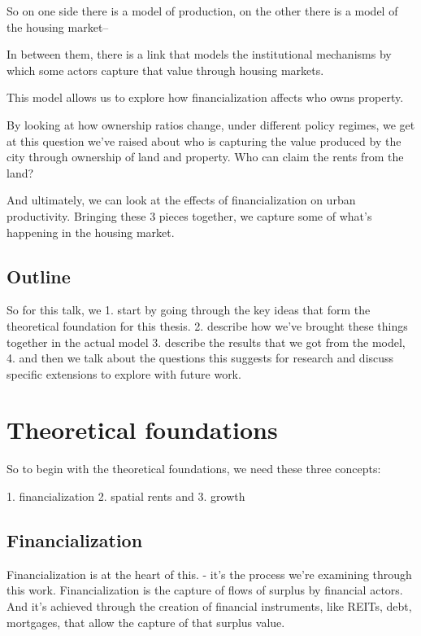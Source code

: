 \documentclass[]{article}
\begin{document}
So on one side there is a model of production, on the other there is a model of the housing market-- 

In between them, there is a link that models the institutional mechanisms by which some actors capture that value through housing markets.


This model allows us to explore  how financialization affects  who owns property.

By looking at how ownership ratios change, under different policy regimes, 
we get at this question we've raised about who is capturing the value produced by the city through ownership of land and property.  Who can claim the rents from the land?

And ultimately, we can look at the effects of financialization on urban productivity.  
Bringing these 3 pieces together, we capture  some of what's happening in the housing market.

\subsection{Outline}

So for this talk, we  
1. start by going through the key ideas that form the theoretical foundation for this thesis. 
 2. describe how we've brought these things together in the actual model 
3. describe the results that we got from the model,
4. and then we talk about the questions this suggests for research and discuss specific extensions to explore with future work. 

\section{Theoretical foundations}

So to begin with the theoretical foundations, we need these three concepts: 

1. financialization
2. spatial rents and
3. growth

\subsection{Financialization}

Financialization is at the heart of this. - it's the process we're examining through this work. 
Financialization is the capture of flows of surplus by financial actors. And it's achieved through the creation of financial instruments, like REITs, debt, mortgages,  that allow the capture of that surplus value.
\end{document}
